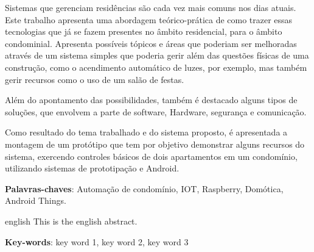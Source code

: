 \setlength{\absparsep}{18pt} %
\begin{resumo}
 
  Sistemas que gerenciam residências são cada vez mais comuns nos dias atuais. Este trabalho apresenta uma abordagem teórico-prática de como trazer essas tecnologias que já se fazem presentes no âmbito residencial, para o âmbito condominial. Apresenta possíveis tópicos e áreas que poderiam ser melhoradas através de um sistema simples que poderia gerir além das questões físicas de uma construção, como o acendimento automático de luzes, por exemplo, mas também gerir recursos como o uso de um salão de festas.
  
  Além do apontamento das possibilidades, também é destacado alguns tipos de soluções, que envolvem a parte de software, Hardware, segurança e comunicação.
  
  Como resultado do tema trabalhado e do sistema proposto, é apresentada a montagem de um protótipo que tem por objetivo demonstrar alguns recursos do sistema, exercendo controles básicos de  dois apartamentos em um condomínio, utilizando sistemas de prototipação e Android.

 \textbf{Palavras-chaves}: Automação de condomínio, IOT, Raspberry, Domótica, Android Things.
\end{resumo}

\begin{resumo}[Abstract]
 \begin{otherlanguage*}{english}
   This is the english abstract.

   \vspace{\onelineskip}
 
   \noindent 
   \textbf{Key-words}: key word 1, key word 2, key word 3
 \end{otherlanguage*}
\end{resumo}

